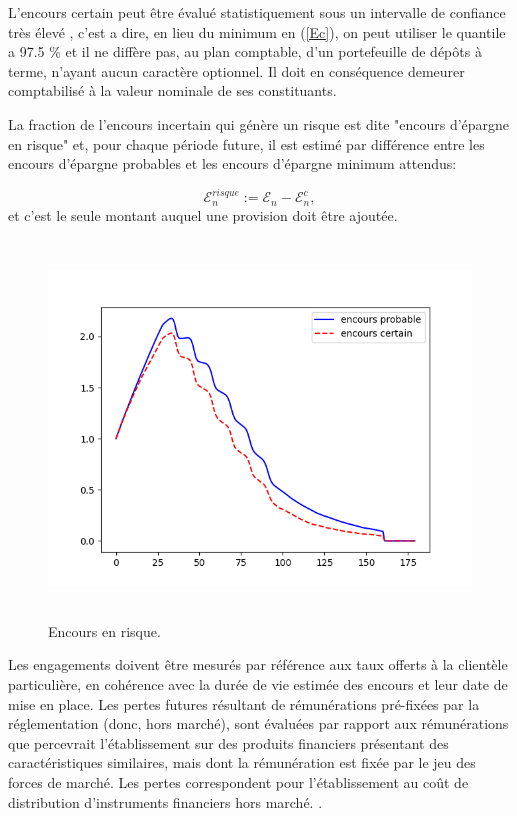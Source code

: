 \documentclass[12pt, a4paper]{book}
\newcommand{\E}{\mathcal{E}}
\begin{document}
L'encours certain peut être évalué statistiquement sous un intervalle de confiance très élevé \cite{CNC2}, c'est a dire, en lieu du minimum en (\ref{Ec}), on peut utiliser le quantile a 97.5 \% et il ne diffère pas, au plan comptable, d'un portefeuille de dépôts à terme, n'ayant aucun caractère optionnel. Il doit en conséquence demeurer comptabilisé à la valeur nominale de ses constituants. 

La fraction de l'encours incertain qui génère un risque est dite "encours d'épargne en risque" et, pour chaque période future, il est estimé par différence entre les encours d'épargne probables et les encours d'épargne minimum attendus:

$$ \E_n^{risque} := \E_n -\E_n^c,$$
et c'est le seule montant auquel une provision doit être ajoutée.
\begin{figure}[!h]
\label{surface_risque}
\centering
\includegraphics[height=10cm,width=16cm]{surface_risque.png}
\caption{Encours en risque.}
\end{figure}

Les engagements doivent être mesurés par référence aux taux offerts à la clientèle particulière, en cohérence avec la durée de vie estimée des encours et leur date de mise en place. Les pertes futures résultant de rémunérations pré-fixées par la réglementation (donc, hors marché), sont évaluées par rapport aux rémunérations que percevrait l'établissement sur des produits financiers présentant des caractéristiques similaires, mais dont la rémunération est fixée par le jeu des forces de marché. Les pertes correspondent pour l'établissement au coût de distribution d'instruments financiers hors marché. \cite{CNC2}.
\end{document}
